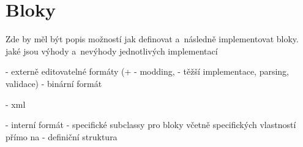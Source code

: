
\section{Bloky}

Zde by měl být popis možností jak definovat a~následně implementovat bloky. jaké jsou výhody a~nevýhody jednotlivých implementací

- externě editovatelné formáty (+ - modding, - těžší implementace, parsing, validace)
- binární formát

- xml


- interní formát
- specifické subclassy pro bloky včetně specifických vlastností přímo na 
- definiční struktura





